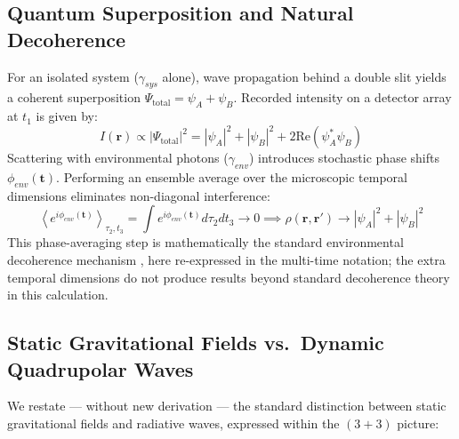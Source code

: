\documentclass[11pt,a4paper]{article}
\begin{document}
\subsection{Quantum Superposition and Natural Decoherence}
For an isolated system ($\gamma_{sys}$ alone), wave propagation behind a double slit yields a coherent superposition $\Psi_{\text{total}} = \psi_A + \psi_B$. Recorded intensity on a detector array at $t_1$ is given by:
\begin{equation}
I(\mathbf{r}) \propto |\Psi_{\text{total}}|^2 = |\psi_A|^2 + |\psi_B|^2 + 2\text{Re}\left(\psi_A^* \psi_B\right)
\end{equation}
Scattering with environmental photons ($\gamma_{env}$) introduces stochastic phase shifts $\phi_{env}(\mathbf{t})$. Performing an ensemble average over the microscopic temporal dimensions eliminates non-diagonal interference:
\begin{equation}
\left\langle e^{i \phi_{env}(\mathbf{t})} \right\rangle_{\tau_2, t_3} = \int e^{i \phi_{env}(\mathbf{t})} d\tau_2 dt_3 \to 0 \implies \rho(\mathbf{r}, \mathbf{r}') \to |\psi_A|^2 + |\psi_B|^2
\end{equation}
This phase-averaging step is mathematically the standard environmental decoherence mechanism \cite{Zurek2003}, here re-expressed in the multi-time notation; the extra temporal dimensions do not produce results beyond standard decoherence theory in this calculation.

\subsection{Static Gravitational Fields vs.\ Dynamic Quadrupolar Waves}
We restate --- without new derivation --- the standard distinction between static gravitational fields and radiative waves, expressed within the $(3+3)$ picture:
\end{document}
